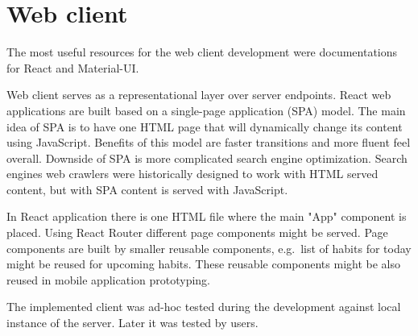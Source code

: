 
\section{Web client}\label{sec:web-client}

The most useful resources for the web client development were documentations for React and Material-UI.\cite{react, material}

Web client serves as a representational layer over server endpoints.
React web applications are built based on a single-page application (SPA) model.
The main idea of SPA is to have one HTML page that will dynamically change its content using JavaScript.
Benefits of this model are faster transitions and more fluent feel overall.
Downside of SPA is more complicated search engine optimization.
Search engines web crawlers were historically designed to work with HTML served content, but with SPA content is served with JavaScript.

In React application there is one HTML file where the main "App" component is placed.
Using React Router different page components might be served.
Page components are built by smaller reusable components, e.g.\ list of habits for today might be reused for upcoming habits.
These reusable components might be also reused in mobile application prototyping.

The implemented client was ad-hoc tested during the development against local instance of the server.
Later it was tested by users.
